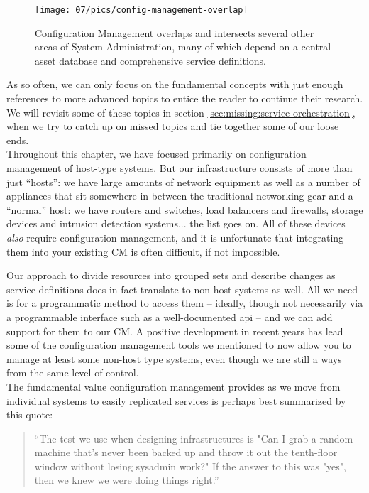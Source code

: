 \begin{figure}[!t]
	\centering
	\texttt{[image: 07/pics/config-management-overlap]}
		\caption[Configuration Management Overlap with other systems]{
			Configuration Management overlaps and
			intersects several other areas
			of System Administration, many
			of which depend on a central asset database and
			comprehensive service definitions.
			\label{fig:configuration-management:cm-overlap}}
\end{figure}

As so often, we can only focus on the fundamental
concepts with just enough references to more advanced
topics to entice the reader to continue their
research. We will revisit some of these topics in
section \ref{sec:missing:service-orchestration}, when
we try to catch up on missed topics and tie together
some of our loose ends. \\

Throughout this chapter, we have focused primarily on
configuration management of host-type systems.  But
our infrastructure consists of more than just
``hosts'': we have large amounts of network
equipment as well as a number of appliances that sit
somewhere in between the traditional networking gear
and a ``normal'' host: we have routers and switches,
load balancers and firewalls, storage devices and
intrusion detection systems... the list goes on.  All
of these devices {\em also} require configuration
management, and it is unfortunate that integrating
them into your existing CM is often difficult, if not
impossible.

Our approach to divide resources into grouped sets and
describe changes as service definitions does in fact
translate to non-host systems as well.  All we need is
for a programmatic method to access them -- ideally,
though not necessarily via a programmable interface
such as a well-documented \gls{api} -- and we can add
support for them to our CM.  A positive development in
recent years has lead some of the configuration
management tools we mentioned to now allow you to
manage at least some non-host type systems, even
though we are still a ways from the same level of
control.  \\

The fundamental value configuration management provides as
we move from individual systems to easily replicated
services is perhaps best summarized by this quote:

\begin{quote}
``The test we use when designing infrastructures is "Can I grab a random
machine that's never been backed up and throw it out the tenth-floor
window without losing sysadmin work?" If the answer to this was "yes",
then we knew we were doing things
right.''\cite{configuration-management:traugott}
\end{quote}


